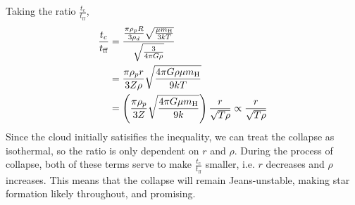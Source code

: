 \documentclass{article}
\begin{document}
\subsection{}

Taking the ratio \(\frac{t_c}{t_{\text{ff}}}\),
\begin{align}
    \frac{t_c}{t_{\text{ff}}} &= \frac{\frac{\pi \rho_p R}{3 \rho_d} \sqrt{\frac{\mu m_{\ce{H}}}{3kT}}}{\sqrt{\frac{3}{4 \pi G \rho}}} \\
    &= \frac{\pi \rho_p r}{3 Z \rho} \sqrt{\frac{4 \pi G \rho \mu m_{\ce{H}}}{9kT}} \\
    &= \left(\frac{\pi \rho_p}{3 Z} \sqrt{\frac{4 \pi G \mu m_{\ce{H}}}{9k}}\right) \frac{r}{\sqrt{T \rho}} \propto \frac{r}{\sqrt{T \rho}}
\end{align}
Since the cloud initially satisifies the inequality, we can treat the collapse as isothermal, so the ratio is only dependent on \(r\) and \(\rho\).
During the process of collapse, both of these terms serve to make \(\frac{t_c}{t_{\text{ff}}}\) smaller, i.e. \(r\) decreases and \(\rho\) increases.
This means that the collapse will remain Jeans-unstable, making star formation likely throughout, and promising.
\end{document}
